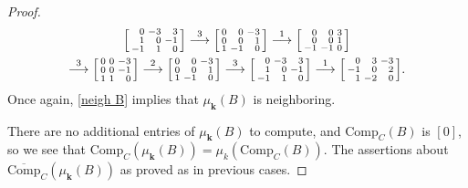\documentclass{amsart}
\theoremstyle{definition}
\theoremstyle{remark}
\numberwithin{equation}{section}
\newcommand{\0}{{\mathbf{0}}}
\newcommand{\Comp}{\mathrm{Comp}_C}
\newcommand{\CompPlus}{\overline{\mathrm{Comp}}_C}
\newcommand{\kk}{{\boldsymbol{k}}}
\begin{document}
\begin{proof}
\begin{multline*}
\begin{bsmallmatrix*}[r]
0&-3&3\\
1&0&-1\\
-1&1&0
\end{bsmallmatrix*}
\overset{3}{\longrightarrow}
\begin{bsmallmatrix*}[r]
0&0&-3\\
0&0&1\\
1&-1&0
\end{bsmallmatrix*}
\overset{1}{\longrightarrow}
\begin{bsmallmatrix*}[r]
0&0&3\\
0&0&1\\
-1&-1&0
\end{bsmallmatrix*}\\
\overset{3}{\longrightarrow}
\begin{bsmallmatrix*}[r]
0&0&-3\\
0&0&-1\\
1&1&0
\end{bsmallmatrix*}
\overset{2}{\longrightarrow}
\begin{bsmallmatrix*}[r]
0&0&-3\\
0&0&1\\
1&-1&0
\end{bsmallmatrix*}
\overset{3}{\longrightarrow}
\begin{bsmallmatrix*}[r]
0&-3&3\\
1&0&-1\\
-1&1&0
\end{bsmallmatrix*}
\overset{1}{\longrightarrow}
\begin{bsmallmatrix*}[r]
0&3&-3\\
-1&0&2\\
1&-2&0
\end{bsmallmatrix*}.
\end{multline*}
Once again, \cref{neigh B} implies that $\mu_\kk(B)$ is neighboring.

There are no additional entries of $\mu_\kk(B)$ to compute, and $\Comp(B)$ is $[0]$, so we see that $\Comp(\mu_\kk(B))=\mu_k(\Comp(B))$.
The assertions about $\CompPlus(\mu_\kk(B))$ as proved as in previous cases.


\end{proof}
\end{document}
